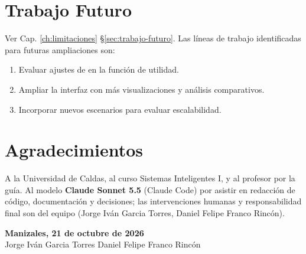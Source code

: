 \section{Trabajo Futuro}
\label{sec:trabajo-futuro-final}

Ver Cap. \ref{ch:limitaciones} §\ref{sec:trabajo-futuro}. Las líneas de trabajo
identificadas para futuras ampliaciones son:
\begin{enumerate}
\item Evaluar ajustes de  en la función de utilidad.
\item Ampliar la interfaz con más visualizaciones y análisis comparativos.
\item Incorporar nuevos escenarios para evaluar escalabilidad.
\end{enumerate}

\section{Agradecimientos}
\label{sec:agradecimientos}

A la Universidad de Caldas, al curso Sistemas Inteligentes I, y al profesor por la guía.
Al modelo \textbf{Claude Sonnet 5.5} (Claude Code) por asistir en redacción de código,
documentación y decisiones; las intervenciones humanas y responsabilidad final son del
equipo (Jorge Iván Garcia Torres, Daniel Felipe Franco Rincón).

\vspace{2cm}
\begin{flushright}
\textbf{Manizales, 21 de octubre de 2026}\\
\vspace{1cm}
Jorge Iván Garcia Torres \hspace{3cm} Daniel Felipe Franco Rincón
\end{flushright}
